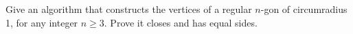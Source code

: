 Give an algorithm that constructs the vertices of a regular $n$-gon of circumradius 1, for any integer $n\ge3$. Prove it closes and has equal sides.
